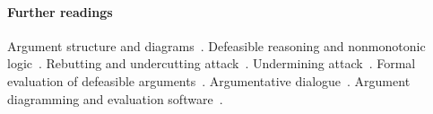 \documentclass[10pt]{article}
\begin{document}
%
%
%
%
%
%

\paragraph{Further readings} 
Argument structure and diagrams~\citep{wigmore1913,toulmin1958,freeman1991}. Defeasible reasoning and nonmonotonic logic~\citep{pollock1987,gabbayEtal1994}. Rebutting and undercutting attack~\citep{pollock1987,pollock1995}. Undermining attack~\citep{bondarenkoEtal1997}. Formal evaluation of defeasible arguments~\citep{pollock1987,pollock1995,dung1995,prakken2010}. Argumentative dialogue~\citep{toulmin1958,waltonKrabbe1995,prakken1997,hage2000}. Argument diagramming and evaluation software~\citep{pollock1995,reedRowe2004,kirschnerEtal2003,vanGelder2003,verheij2005,gordonEtal2007}.
\end{document}
